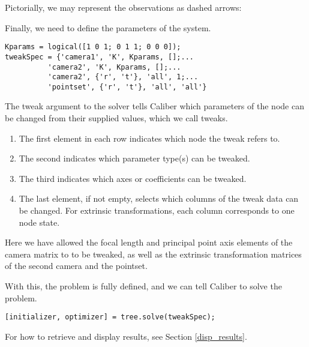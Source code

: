 Pictorially, we may represent the observations as dashed arrows:

\centerline{}

Finally, we need to define the parameters of the system.

\begin{verbatim}
Kparams = logical([1 0 1; 0 1 1; 0 0 0]);
tweakSpec = {'camera1', 'K', Kparams, [];...
          'camera2', 'K', Kparams, [];...
          'camera2', {'r', 't'}, 'all', 1;...
          'pointset', {'r', 't'}, 'all', 'all'}
\end{verbatim}

The tweak argument to the solver tells Caliber which parameters of the node 
can be changed from their supplied values, which we call tweaks.
\begin{enumerate}
	\item The first element in each row indicates which node the tweak refers to.
	\item The second indicates which parameter type(s) can be tweaked.
	\item The third indicates which axes or coefficients can be tweaked.
	\item The last element, if not empty, selects which columns of the tweak data can be changed.
	For extrinsic transformations, each column corresponds to one node state.
\end{enumerate}

Here we have allowed the 
focal length and principal point axis elements of the camera matrix to
to be tweaked, as well as the extrinsic transformation matrices of the second camera and the pointset.

With this, the problem is fully defined, and we can tell Caliber to solve the problem. 

\begin{verbatim}
[initializer, optimizer] = tree.solve(tweakSpec);
\end{verbatim}

For how to retrieve and display results, see Section \ref{disp_results}.
